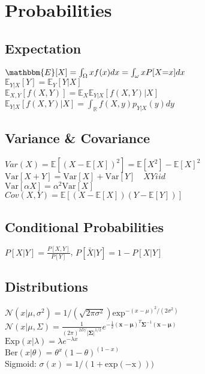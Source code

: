 \section*{Probabilities}
\subsection*{Expectation}
$\mathbbm{E}[X]=\int_{\Omega}xf(x)dx=\int_{\omega}xP[X{=}x]dx$\\
$\mathbb{E}_{Y|X}[Y]=\mathbb{E}_{Y}[Y|X]$\\
$\mathbb{E}_{X,Y}[f(X,Y)]=\mathbb{E}_{X}\mathbb{E}_{Y|X}[f(X,Y)|X]$\\
$\mathbb{E}_{Y|X}[f(X,Y)|X]{=}\int_\mathbb{R}f(X,y)p_{Y|X}(y)dy$

\subsection*{Variance \& Covariance}
$Var(X){=}\mathbb{E}[(X{-}\mathbb{E}[X])^2]{=}\mathbb{E}[X^2]{-}\mathbb{E}[X]^2$\\
$\mathrm{Var}[X+Y]{=}\mathrm{Var}[X]+\mathrm{Var}[Y]\quad XY iid$\\
$\mathrm{Var}[\alpha X]=\alpha^2\mathrm{Var}[X]$\\
$Cov(X,Y)=\mathbb{E}[(X-\mathbb{E}[X])(Y-\mathbb{E}[Y])]$

\subsection*{Conditional Probabilities}
$P[X|Y]=\frac{P[X,Y]}{P[Y]}$, 
$P[\bar{X}|Y]=1-P[X|Y]$

\subsection*{Distributions}
$\mathcal{N}(x|\mu, \sigma^2)=1/(\sqrt{2\pi\sigma^2})\mathrm{exp}^{-(x-\mu)^2/(2\sigma^2)}$\\
$\mathcal{N}(x|\mu, \Sigma)= \frac{1}{(2\pi)^{2D/}|\mathbf{\Sigma}|^{1/2}} e^{-\frac{1}{2}(\mathbf{x}-\mathbf{\mu})^T\mathbf{\Sigma}^{-1}(\mathbf{x}-\mathbf{\mu})}$\\
$\mathrm{Exp}(x|\lambda){=}\lambda e^{-\lambda x}$\\ $\mathrm{Ber}(x|\theta){=}\theta^x (1{-}\theta)^{(1-x)}$\\
Sigmoid: $\sigma(x)=1/(1+\mathrm{exp(-x)}))$


